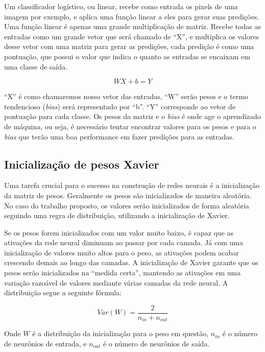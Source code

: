 Um classificador logístico, ou linear, recebe como entrada os pixels
de uma imagem por exemplo, e aplica uma função linear a eles para
gerar suas predições. Uma função linear é apenas uma grande
multiplicação de matriz. Recebe todas as entradas como um grande vetor
que será chamado de ``X'', e multiplica os valores desse vetor com uma
matriz para gerar as predições, cada predição é como uma pontuação,
que possui o valor que indica o quanto as entradas se encaixam em uma
classe de saída.

\begin{equation}
   WX + b = Y
\end{equation}

``X'' é como chamaremos nosso vetor das entradas, ``W'' serão pesos e
o termo tendencioso (\textit{bias}) será representado por ``b''. ``Y''
corresponde ao vetor de pontuação para cada classe. Os pesos da
matriz e o \textit{bias} é onde age o aprendizado de máquina, ou seja,
é necessário tentar encontrar valores para os pesos e para o
\textit{bias} que terão uma boa performance em fazer predições para as
entradas.

\subsection{Inicialização de pesos Xavier}

Uma tarefa crucial para o sucesso na construção de redes neurais é a
inicialização da matriz de pesos. Geralmente os pesos são
inicializados de maneira aleatória. No caso do trabalho proposto,
os valores serão inicializados de forma aleatória seguindo uma regra
de distribuição, utilizando a inicialização de Xavier\cite{Glorot}.

Se os pesos forem inicializados com um valor muito baixo, é capaz que
as ativações da rede neural diminuam ao passar por cada camada. Já com
uma inicialização de valores muito altos para o peso, as ativações
podem acabar crescendo demais ao longo das camadas. A inicialização de
Xavier garante que os pesos serão inicializados na ``medida certa'',
mantendo as ativações em uma variação razoável de valores mediante
várias camadas da rede neural. A distribuição segue a seguinte
fórmula:

\begin{equation}
  Var(W) = \frac{2}{n_{in}+n_{out}}
\end{equation}

Onde $W$ é a distribuição da inicialização para o peso em questão,
$n_{in}$ é o número de neurônios de entrada, e $n_{out}$ é o número de
neurônios de saída.

